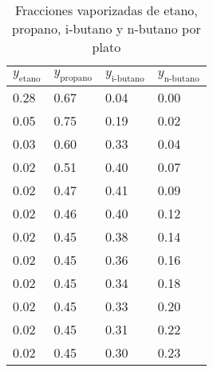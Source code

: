 \newpage
\begin{table}[ht]
    \centering\small
    \caption{Fracciones vaporizadas de etano, propano, i-butano y n-butano por plato}
    \begin{tabular}{|p{2.5cm}|p{2.5cm}|p{2.5cm}|p{2.5cm}|}
        \hline
        \textbf{$y_{\text{etano}}$} & \textbf{$y_{\text{propano}}$} & \textbf{$y_{\text{i-butano}}$} & \textbf{$y_{\text{n-butano}}$} \\ \hline
        0.28                        & 0.67                          & 0.04                           & 0.00                           \\ \hline
        0.05                        & 0.75                          & 0.19                           & 0.02                           \\ \hline
        0.03                        & 0.60                          & 0.33                           & 0.04                           \\ \hline
        0.02                        & 0.51                          & 0.40                           & 0.07                           \\ \hline
        0.02                        & 0.47                          & 0.41                           & 0.09                           \\ \hline
        0.02                        & 0.46                          & 0.40                           & 0.12                           \\ \hline
        0.02                        & 0.45                          & 0.38                           & 0.14                           \\ \hline
        0.02                        & 0.45                          & 0.36                           & 0.16                           \\ \hline
        0.02                        & 0.45                          & 0.34                           & 0.18                           \\ \hline
        0.02                        & 0.45                          & 0.33                           & 0.20                           \\ \hline
        0.02                        & 0.45                          & 0.31                           & 0.22                           \\ \hline
        0.02                        & 0.45                          & 0.30                           & 0.23                           \\ \hline

\end{tabular}
\end{table}
